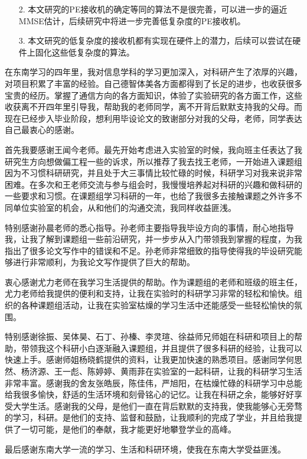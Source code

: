\documentclass[bachelor,nocolorlinks, printoneside]{seuthesis} %
\begin{document}
\begin{Main}
\begin{itemize}
\item[2.]本文研究的PE接收机的确定等同的算法不是很完善，可以进一步的逼近MMSE估计，后续研究中将进一步完善低复杂度的PE接收机。

\item[3.]本文研究的低复杂度的接收机都有实现在硬件上的潜力，后续可以尝试在硬件上固化这些低复杂度的算法。
\end{itemize}

\end{Main} %

%


\begin{Acknowledgement}
	在东南学习的四年里，我对信息学科的学习更加深入，对科研产生了浓厚的兴趣，对项目积累了丰富的经验。自己德智体美各方面都得到了长足的进步，也收获很多宝贵的经历。掌握了通信方向的各方面知识，体验了实验研究的各方面工作，这些收获离不开四年里引导我，帮助我的老师同学，离不开背后默默支持我的父母。而现在已经步入毕业阶段，想利用毕设论文的致谢部分对我的父母，老师，同学表达自己最衷心的感谢。
	
	首先我要感谢王闻今老师。最先开始考虑进入实验室的时候，我向班主任表达了我研究生方向想做偏工程一些的诉求，所以推荐了我去找王老师，一开始进入课题组因为不习惯科研研究，并且处于大三事情比较忙碌的时候，科研学习对我来说非常困难。在多次和王老师交流与参与组会时，我慢慢培养起对科研的兴趣和做科研的一些要求和习惯。在课题组学习科研的一年，也给了我很多去接触课题之外许多不同单位实验室的机会，从和他们的沟通交流，我同样收益匪浅。
	
	特别感谢孙晨老师的悉心指导。孙老师主要指导我毕设方向的事情，耐心地指导我，让我了解到课题组一些前沿研究，并一步步从入门带领我到掌握的程度，为我指出了很多论文写作中的错误和不足。孙老师非常细致的指导使得我的毕设研究能够进行非常顺利，为我论文写作提供了巨大的帮助。
	
	衷心感谢尤力老师在我学习生活提供的帮助。作为课题组的老师和班级的班主任，尤力老师给我提供的便利和支持，让我在实验时的科研学习非常的轻松和愉快。组织的各种课题组活动，让我在实验室枯燥的学习生活中还能感受一些轻松愉快的氛围。
	
	特别感谢徐振、吴体昊、石丁、孙榛、李灵瑄、徐益师兄师姐在科研和项目上的帮助，带领我这个科研小白逐渐融入课题组，并且提供了很多科研的经验，让我可以快速上手。感谢师姐杨晓鹤提供的资料，让我更加快速的熟悉项目。感谢同学何思然、杨济源、王一彪、陈婷婷、黄雨菲在实验室的一起科研，让我的科研学习生活非常丰富。感谢我的舍友张皓辰，陈佳伟，严旭阳，在枯燥忙碌的科研学习中总能给我很多愉快，舒适的生活环境和刻骨铭心的记忆。让我在科研之余，能够好好享受大学生活。感谢我的父母，是他们一直在背后默默的支持我，使我能够心无旁骛的学习，科研。是他们的支持、监督和鼓励，让我顺利的完成了学业，并且给我提供了一切可能，是他们的奉献，我才能更好地攀登学业的高峰。
	
	最后感谢东南大学一流的学习、生活和科研环境，使我在东南大学受益匪浅。
	
\end{Acknowledgement}

\newpage
\printindex %




%

 
\end{document}
